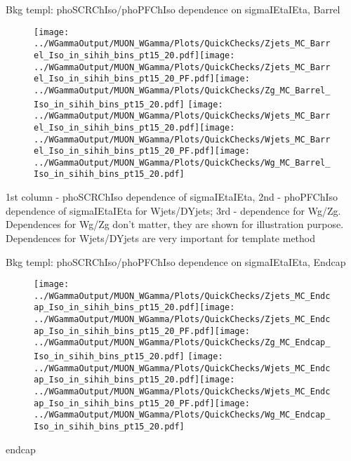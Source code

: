 \documentclass{beamer}
\begin{document}
\begin{frame}{Bkg templ: phoSCRChIso/phoPFChIso dependence on sigmaIEtaIEta, Barrel}
  \begin{figure}
    \centering
    \texttt{[image: ../WGammaOutput/MUON\_WGamma/Plots/QuickChecks/Zjets\_MC\_Barrel\_Iso\_in\_sihih\_bins\_pt15\_20.pdf]}\texttt{[image: ../WGammaOutput/MUON\_WGamma/Plots/QuickChecks/Zjets\_MC\_Barrel\_Iso\_in\_sihih\_bins\_pt15\_20\_PF.pdf]}\texttt{[image: ../WGammaOutput/MUON\_WGamma/Plots/QuickChecks/Zg\_MC\_Barrel\_Iso\_in\_sihih\_bins\_pt15\_20.pdf]}
    \texttt{[image: ../WGammaOutput/MUON\_WGamma/Plots/QuickChecks/Wjets\_MC\_Barrel\_Iso\_in\_sihih\_bins\_pt15\_20.pdf]}\texttt{[image: ../WGammaOutput/MUON\_WGamma/Plots/QuickChecks/Wjets\_MC\_Barrel\_Iso\_in\_sihih\_bins\_pt15\_20\_PF.pdf]}\texttt{[image: ../WGammaOutput/MUON\_WGamma/Plots/QuickChecks/Wg\_MC\_Barrel\_Iso\_in\_sihih\_bins\_pt15\_20.pdf]}
  \end{figure}
  \scriptsize 1st column - phoSCRChIso dependence of sigmaIEtaIEta, 2nd - phoPFChIso dependence of sigmaIEtaIEta for Wjets/DYjets; 3rd - dependence for Wg/Zg. Dependences for Wg/Zg don't matter, they are shown for illustration purpose. Dependences for Wjets/DYjets are very important for template method
\end{frame}

\begin{frame}{Bkg templ: phoSCRChIso/phoPFChIso dependence on sigmaIEtaIEta, Endcap}
  \begin{figure}
    \centering
    \texttt{[image: ../WGammaOutput/MUON\_WGamma/Plots/QuickChecks/Zjets\_MC\_Endcap\_Iso\_in\_sihih\_bins\_pt15\_20.pdf]}\texttt{[image: ../WGammaOutput/MUON\_WGamma/Plots/QuickChecks/Zjets\_MC\_Endcap\_Iso\_in\_sihih\_bins\_pt15\_20\_PF.pdf]}\texttt{[image: ../WGammaOutput/MUON\_WGamma/Plots/QuickChecks/Zg\_MC\_Endcap\_Iso\_in\_sihih\_bins\_pt15\_20.pdf]}
    \texttt{[image: ../WGammaOutput/MUON\_WGamma/Plots/QuickChecks/Wjets\_MC\_Endcap\_Iso\_in\_sihih\_bins\_pt15\_20.pdf]}\texttt{[image: ../WGammaOutput/MUON\_WGamma/Plots/QuickChecks/Wjets\_MC\_Endcap\_Iso\_in\_sihih\_bins\_pt15\_20\_PF.pdf]}\texttt{[image: ../WGammaOutput/MUON\_WGamma/Plots/QuickChecks/Wg\_MC\_Endcap\_Iso\_in\_sihih\_bins\_pt15\_20.pdf]}
  \end{figure}
  \scriptsize endcap
\end{frame}
\end{document}
